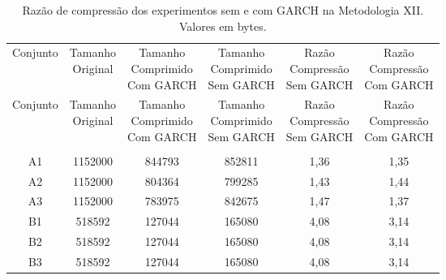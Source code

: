 \begin{center}
\begin{longtable}{cccccc}
\toprule
\rowcolor{white}
\caption[Metodologia XII: Razão de compressão]{Razão de compressão dos
experimentos sem e com GARCH na Metodologia XII.
Valores em bytes.} \label{Tab:razaocompressaoMet} \\
\midrule
Conjunto & \specialcell{Tamanho \\Original} & \specialcell{Tamanho
\\Comprimido\\Com GARCH} & \specialcell{Tamanho
\\Comprimido\\Sem GARCH} & \specialcell{Razão \\Compressão
\\Sem GARCH} & \specialcell{Razão \\Compressão
\\Com GARCH} \\
\midrule
\endfirsthead
\midrule
\rowcolor{white}
Conjunto & \specialcell{Tamanho \\Original} & \specialcell{Tamanho
\\Comprimido\\Com GARCH} & \specialcell{Tamanho
\\Comprimido\\Sem GARCH} & \specialcell{Razão \\Compressão
\\Sem GARCH} & \specialcell{Razão \\Compressão
\\Com GARCH} \\
\toprule
\endhead
\midrule \\ %
\endfoot
\bottomrule
\endlastfoot
    A1    & 1152000 & 844793 & 852811 & 1,36  & 1,35 \\
    A2    & 1152000 & 804364 & 799285 & 1,43  & 1,44 \\
    A3    & 1152000 & 783975 & 842675 & 1,47  & 1,37 \\
    B1    & 518592 & 127044 & 165080 & 4,08  & 3,14 \\
    B2    & 518592 & 127044 & 165080 & 4,08  & 3,14 \\
    B3    & 518592 & 127044 & 165080 & 4,08  & 3,14 \\

\end{longtable}
\end{center}
